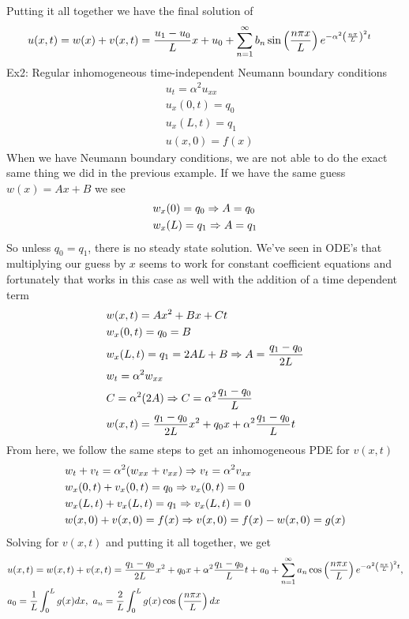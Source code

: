 \documentclass[11pt, fleqn]{article}
\begin{document}
Putting it all together we have the final solution of
\begin{align*}
    &u(x,t)=w(x)+v(x,t)=\frac{u_1-u_0}{L}x+u_0+\sum_{n=1}^\infty b_n\sin\left( \frac{n\pi x}{L} \right)e^{-\alpha^2\left( \frac{n\pi}{L} \right)^2t}
\end{align*}
Ex2: Regular inhomogeneous time-independent Neumann boundary conditions
\begin{align*}
    &u_t=\alpha^2 u_{xx}\\
    &u_x(0,t)=q_0\\
    &u_x(L,t)=q_1\\
    &u(x,0)=f(x)
\end{align*}
When we have Neumann boundary conditions, we are not able to do the exact same thing we did in the previous example. If we have the same guess $w(x)=Ax+B$ we see
\begin{align*}
    &w_x(0)=q_0\Rightarrow A=q_0\\
    &w_x(L)=q_1\Rightarrow A=q_1
\end{align*}
So unless $q_0=q_1$, there is no steady state solution. We've seen in ODE's that multiplying our guess by $x$ seems to work for constant coefficient equations and fortunately that works in this case as well with the addition of a time dependent term
\begin{align*}
    &w(x,t)=Ax^2+Bx+Ct\\
    &w_x(0,t)=q_0=B\\
    &w_x(L,t)=q_1=2AL+B\Rightarrow A=\frac{q_1-q_0}{2L}\\
    &w_t=\alpha^2w_{xx}\\
    &C=\alpha^2(2A)\Rightarrow C=\alpha^2\frac{q_1-q_0}{L}\\
    &w(x,t)=\frac{q_1-q_0}{2L}x^2+q_0x+\alpha^2\frac{q_1-q_0}{L}t
\end{align*}
From here, we follow the same steps to get an inhomogeneous PDE for $v(x,t)$
\begin{align*}
    &w_t+v_t=\alpha^2(w_{xx}+v_{xx})\Rightarrow v_t=\alpha^2 v_{xx}\\
    &w_x(0,t)+v_x(0,t)=q_0\Rightarrow v_x(0,t)=0\\
    &w_x(L,t)+v_x(L,t)=q_1\Rightarrow v_x(L,t)=0\\
    &w(x,0)+v(x,0)=f(x)\Rightarrow v(x,0)=f(x)-w(x,0)=g(x)
\end{align*}
Solving for $v(x,t)$ and putting it all together, we get
\begin{align*}
    &u(x,t)=w(x,t)+v(x,t)=\frac{q_1-q_0}{2L}x^2+q_0x+\alpha^2\frac{q_1-q_0}{L}t+a_0+\sum_{n=1}^\infty a_n\cos\left( \frac{n\pi x}{L} \right)e^{-\alpha^2\left( \frac{n\pi }{L} \right)^2t},\\
    &a_0=\frac{1}{L}\int_0^L g(x)dx,\ a_n=\frac{2}{L}\int_0^L g(x)\cos\left( \frac{n\pi x}{L} \right)dx
\end{align*}
\end{document}
